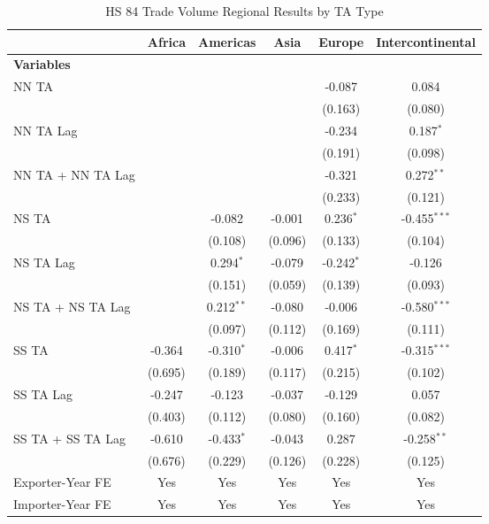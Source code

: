 \begin{table}[htbp]
    \centering
    \caption{HS 84 Trade Volume Regional Results by TA Type}
    \label{tab:84_trade_pta_types}
    \begin{adjustbox}{max width=\textwidth}
    \begin{tabular}{lccccc}
    \hline
     & \multicolumn{1}{c}{Africa} & \multicolumn{1}{c}{Americas} & \multicolumn{1}{c}{Asia} & \multicolumn{1}{c}{Europe} & \multicolumn{1}{c}{Intercontinental} \\
    \hline
    \textbf{Variables} &  &  &  &  &  \\
    \hline
    NN TA &  &  &  & -0.087 & 0.084 \\
     &  &  &  & (0.163) & (0.080) \\
    NN TA Lag &  &  &  & -0.234 & 0.187$^{\ast}$ \\
     &  &  &  & (0.191) & (0.098) \\
    NN TA + NN TA Lag &  &  &  & -0.321 & 0.272$^{\ast\ast}$ \\
     &  &  &  & (0.233) & (0.121) \\
    \hline
    NS TA &  & -0.082 & -0.001 & 0.236$^{\ast}$ & -0.455$^{\ast\ast\ast}$ \\
     &  & (0.108) & (0.096) & (0.133) & (0.104) \\
    NS TA Lag &  & 0.294$^{\ast}$ & -0.079 & -0.242$^{\ast}$ & -0.126 \\
     &  & (0.151) & (0.059) & (0.139) & (0.093) \\
    NS TA + NS TA Lag &  & 0.212$^{\ast\ast}$ & -0.080 & -0.006 & -0.580$^{\ast\ast\ast}$ \\
     &  & (0.097) & (0.112) & (0.169) & (0.111) \\
    \hline
    SS TA & -0.364 & -0.310$^{\ast}$ & -0.006 & 0.417$^{\ast}$ & -0.315$^{\ast\ast\ast}$ \\
     & (0.695) & (0.189) & (0.117) & (0.215) & (0.102) \\
    SS TA Lag & -0.247 & -0.123 & -0.037 & -0.129 & 0.057 \\
     & (0.403) & (0.112) & (0.080) & (0.160) & (0.082) \\
    SS TA + SS TA Lag & -0.610 & -0.433$^{\ast}$ & -0.043 & 0.287 & -0.258$^{\ast\ast}$ \\
     & (0.676) & (0.229) & (0.126) & (0.228) & (0.125) \\
    \hline
    Exporter-Year FE & Yes & Yes & Yes & Yes & Yes \\
    Importer-Year FE & Yes & Yes & Yes & Yes & Yes \\

\end{tabular}
\end{adjustbox}
\end{table}
